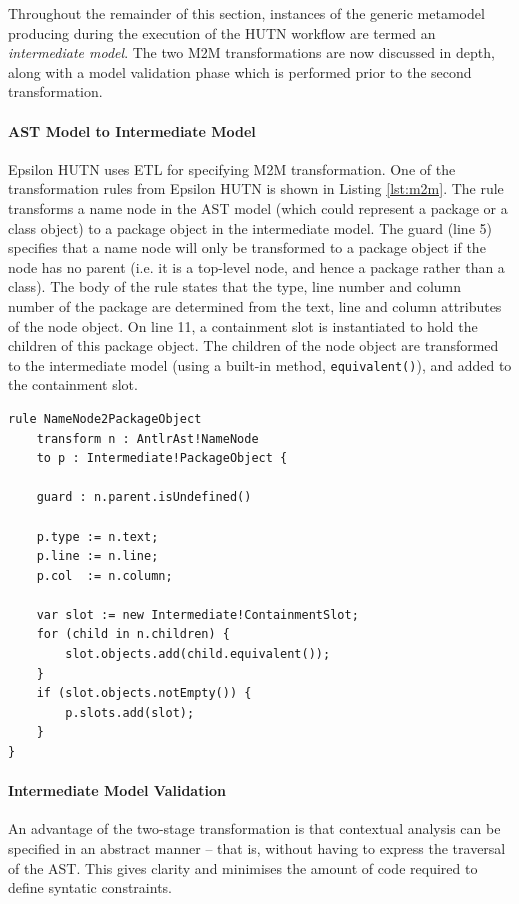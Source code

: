 Throughout the remainder of this section, instances of the generic metamodel producing during the execution of the HUTN workflow are termed an \textit{intermediate model}. The two M2M transformations are now discussed in depth, along with a model validation phase which is performed prior to the second transformation.

\paragraph{AST Model to Intermediate Model}
Epsilon HUTN uses ETL for specifying M2M transformation. One of the transformation rules from Epsilon HUTN is shown in Listing \ref{lst:m2m}. The rule transforms a name node in the AST model (which could represent a package or a class object) to a package object in the intermediate model. The guard (line 5) specifies that a name node will only be transformed to a package object if the node has no parent (i.e. it is a top-level node, and hence a package rather than a class). The body of the rule states that the type, line number and column number of the package are determined from the text, line and column attributes of the node object. On line 11, a containment slot is instantiated to hold the children of this package object. The children of the node object are transformed to the intermediate model (using a built-in method, \verb|equivalent()|), and added to the containment slot.

\begin{lstlisting}[caption=Transformation rule (in ETL) to convert AST nodes to package objects., label=lst:m2m, language=ETL]
rule NameNode2PackageObject
    transform n : AntlrAst!NameNode
    to p : Intermediate!PackageObject {

    guard : n.parent.isUndefined()

    p.type := n.text;
    p.line := n.line;
    p.col  := n.column;

    var slot := new Intermediate!ContainmentSlot;
    for (child in n.children) {
        slot.objects.add(child.equivalent());
    }
    if (slot.objects.notEmpty()) {
        p.slots.add(slot);
    }
}
\end{lstlisting}

\paragraph{Intermediate Model Validation}
An advantage of the two-stage transformation is that contextual analysis can be specified in an abstract manner -- that is, without having to express the traversal of the AST. This gives clarity and minimises the amount of code required to define syntatic constraints.

